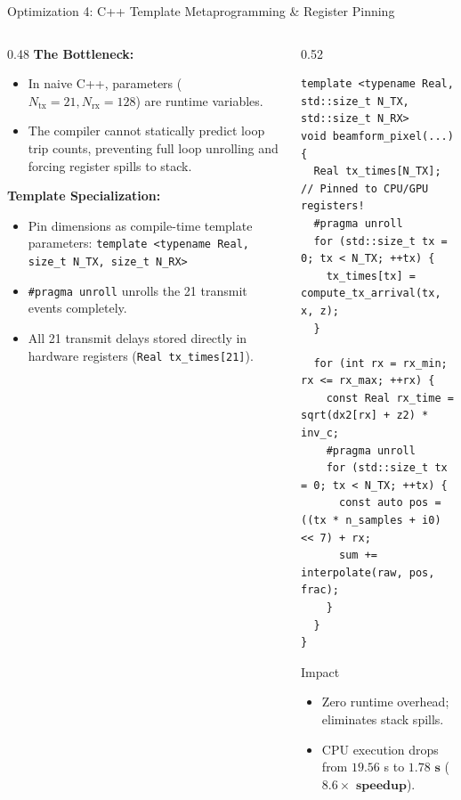 \documentclass[aspectratio=169,10pt]{beamer}
\begin{document}
\begin{frame}[fragile]{Optimization 4: C++ Template Metaprogramming \& Register Pinning}
  \begin{columns}[T]
    \begin{column}{0.48\textwidth}
      \textbf{\small The Bottleneck:}
      \scriptsize
      \begin{itemize}
        \item In naive C++, parameters ($N_{\text{tx}}=21, N_{\text{rx}}=128$) are runtime variables.
        \item The compiler cannot statically predict loop trip counts, preventing full loop unrolling and forcing register spills to stack.
      \end{itemize}
      \textbf{\small Template Specialization:}
      \scriptsize
      \begin{itemize}
        \item Pin dimensions as compile-time template parameters:
        \texttt{template <typename Real, size\_t N\_TX, size\_t N\_RX>}
        \item \texttt{\#pragma unroll} unrolls the 21 transmit events completely.
        \item All 21 transmit delays stored directly in hardware registers (\texttt{Real tx\_times[21]}).
      \end{itemize}
    \end{column}
    \begin{column}{0.52\textwidth}
\begin{lstlisting}[caption={Specialized Template Kernel}]
template <typename Real, std::size_t N_TX, std::size_t N_RX>
void beamform_pixel(...) {
  Real tx_times[N_TX]; // Pinned to CPU/GPU registers!
  #pragma unroll
  for (std::size_t tx = 0; tx < N_TX; ++tx) {
    tx_times[tx] = compute_tx_arrival(tx, x, z);
  }

  for (int rx = rx_min; rx <= rx_max; ++rx) {
    const Real rx_time = sqrt(dx2[rx] + z2) * inv_c;
    #pragma unroll
    for (std::size_t tx = 0; tx < N_TX; ++tx) {
      const auto pos = ((tx * n_samples + i0) << 7) + rx;
      sum += interpolate(raw, pos, frac);
    }
  }
}
\end{lstlisting}
      \begin{block}{Impact}
        \scriptsize
        \begin{itemize}
          \item Zero runtime overhead; eliminates stack spills.
          \item CPU execution drops from $19.56$ s to $\mathbf{1.78\text{ s}}$ ($\mathbf{8.6\times\text{ speedup}}$).
        \end{itemize}
      \end{block}
    \end{column}
  \end{columns}
\end{frame}
\end{document}
